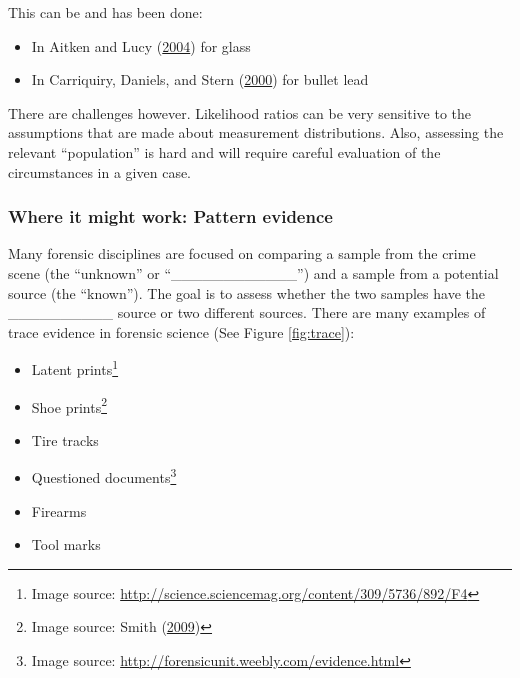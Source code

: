 \documentclass[]{book}
\providecommand{\tightlist}{%
  \setlength{\itemsep}{0pt}\setlength{\parskip}{0pt}}
\let\rmarkdownfootnote\footnote%
\def\footnote{\protect\rmarkdownfootnote}
\theoremstyle{definition}
\theoremstyle{definition}
\theoremstyle{remark}
\begin{document}
This can be and has been done:

\begin{itemize}
\tightlist
\item
  In Aitken and Lucy (\protect\hyperlink{ref-aitkenlucy}{2004}) for
  glass
\item
  In Carriquiry, Daniels, and Stern
  (\protect\hyperlink{ref-aliciaetal}{2000}) for bullet lead
\end{itemize}

There are challenges however. Likelihood ratios can be very sensitive to
the assumptions that are made about measurement distributions. Also,
assessing the relevant ``population'' is hard and will require careful
evaluation of the circumstances in a given case.

\subsubsection{Where it might work: Pattern
evidence}\label{where-it-might-work-pattern-evidence}

Many forensic disciplines are focused on comparing a sample from the
crime scene (the ``unknown'' or ``\_\_\_\_\_\_\_\_\_\_\_\_'') and a
sample from a potential source (the ``known''). The goal is to assess
whether the two samples have the \_\_\_\_\_\_\_\_\_\_ source or two
different sources. There are many examples of trace evidence in forensic
science (See Figure \ref{fig:trace}):

\begin{itemize}
\tightlist
\item
  Latent prints\footnote{Image source:
    \url{http://science.sciencemag.org/content/309/5736/892/F4}}
\item
  Shoe prints\footnote{Image source: Smith
    (\protect\hyperlink{ref-shoepic}{2009})}
\item
  Tire tracks
\item
  Questioned documents\footnote{Image source:
    \url{http://forensicunit.weebly.com/evidence.html}}
\item
  Firearms
\item
  Tool marks
\end{itemize}
\end{document}
